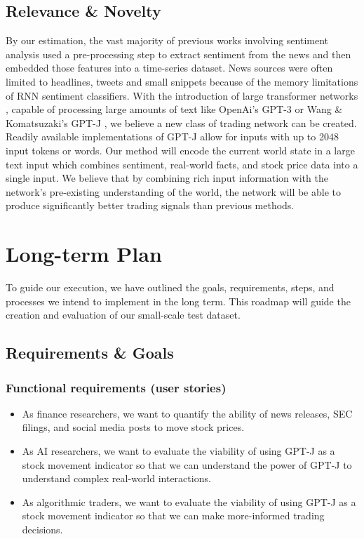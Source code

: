 \documentclass[conference]{IEEEtran}
\begin{document}
\subsection{Relevance \& Novelty}
By our estimation, the vast majority of previous works involving sentiment analysis used a pre-processing step to extract sentiment from the news and then embedded those features into a time-series dataset. News sources were often limited to headlines, tweets and small snippets because of the memory limitations of RNN sentiment classifiers. With the introduction of large transformer networks \cite{Vaswani2017}, capable of processing large amounts of text like OpenAi's GPT-3 \cite{Brown2020} or Wang \& Komatsuzaki's GPT-J \cite{gpt-j}, we believe a new class of trading network can be created. Readily available implementations of GPT-J allow for inputs with up to 2048 input tokens or words. Our method will encode the current world state in a large text input which combines sentiment, real-world facts, and stock price data into a single input. We believe that by combining rich input information with the network's pre-existing understanding of the world, the network will be able to produce significantly better trading signals than previous methods.

\section{Long-term Plan}
To guide our execution, we have outlined the goals, requirements, steps, and processes we intend to implement in the long term. This roadmap will guide the creation and evaluation of our small-scale test dataset.
\subsection{Requirements \& Goals}
\subsubsection{Functional requirements (user stories)}
\begin{itemize}
    \item As finance researchers, we want to quantify the ability of news releases, SEC filings, and social media posts to move stock prices.
    \item As AI researchers, we want to evaluate the viability of using GPT-J as a stock movement indicator so that we can understand the power of GPT-J to understand complex real-world interactions.
    \item As algorithmic traders, we want to evaluate the viability of using GPT-J as a stock movement indicator so that we can make more-informed trading decisions.
\end{itemize}
\end{document}
